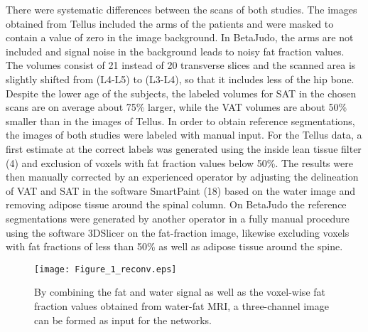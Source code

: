 \documentclass[10pt,letterpaper]{article}
\begin{document}
	There were systematic differences between the scans of both studies. The images obtained from Tellus included the arms of the patients and were masked to contain a value of zero in the image background. In BetaJudo, the arms are not included and signal noise in the background leads to noisy fat fraction values. The volumes consist of 21 instead of 20 transverse slices and the scanned area is slightly shifted from (L4-L5) to (L3-L4), so that it includes less of the hip bone. Despite the lower age of the subjects, the labeled volumes for SAT in the chosen scans are on average about 75\% larger, while the VAT volumes are about 50\% smaller than in the images of Tellus.
	In order to obtain reference segmentations, the images of both studies were labeled with manual input. For the Tellus data, a first estimate at the correct labels was generated using the inside lean tissue filter (4) and exclusion of voxels with fat fraction values below 50\%. The results were then manually corrected by an experienced operator by adjusting the delineation of VAT and SAT in the software SmartPaint (18) based on the water image and removing adipose tissue around the spinal column. On BetaJudo the reference segmentations were generated by another operator in a fully manual procedure using the software 3DSlicer on the fat-fraction image, likewise excluding voxels with fat fractions of less than 50\% as well as adipose tissue around the spine.

	\begin{figure}[t] %


		\texttt{[image: Figure\_1\_reconv.eps]}

		\caption{By combining the fat and water signal as well as the voxel-wise fat fraction values obtained from water-fat MRI, a three-channel image can be formed as input for the networks.}

		\label{fig1} %

	\end{figure}
\end{document}

